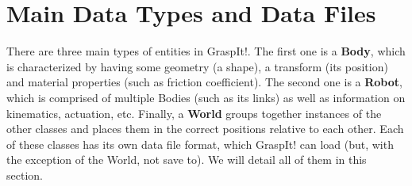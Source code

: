 \section{Main Data Types and Data Files}


There are three main types of entities in GraspIt!. The first one is a
\textbf{Body}, which is characterized by having some geometry (a
shape), a transform (its position) and material properties (such as
friction coefficient). The second one is a \textbf{Robot}, which is
comprised of multiple Bodies (such as its links) as well as
information on kinematics, actuation, etc. Finally, a \textbf{World}
groups together instances of the other classes and places them in the
correct positions relative to each other. Each of these classes has
its own data file format, which GraspIt! can load (but, with the
exception of the World, not save to). We will detail all of them in
this section.

